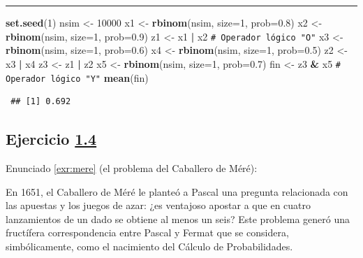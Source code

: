 \documentclass[
  spanish,
  10pt,
]{book}
\newenvironment{Shaded}{\begin{snugshade}}{\end{snugshade}}
\newcommand{\AttributeTok}[1]{\textcolor[rgb]{0.13,0.29,0.53}{#1}}
\newcommand{\CommentTok}[1]{\textcolor[rgb]{0.56,0.35,0.01}{\textit{#1}}}
\newcommand{\DecValTok}[1]{\textcolor[rgb]{0.00,0.00,0.81}{#1}}
\newcommand{\FloatTok}[1]{\textcolor[rgb]{0.00,0.00,0.81}{#1}}
\newcommand{\FunctionTok}[1]{\textcolor[rgb]{0.13,0.29,0.53}{\textbf{#1}}}
\newcommand{\NormalTok}[1]{#1}
\newcommand{\OtherTok}[1]{\textcolor[rgb]{0.56,0.35,0.01}{#1}}
\newcommand{\SpecialCharTok}[1]{\textcolor[rgb]{0.81,0.36,0.00}{\textbf{#1}}}
\theoremstyle{break}
\theoremstyle{nonumberplain}
\renewcommand{\CommentTok}[1]{\textcolor[rgb]{0.41,0.41,0.41}{\texttt{#1}}}
\begin{document}
\begin{center}\rule{0.5\linewidth}{0.5pt}\end{center}

\begin{Shaded}
\begin{Highlighting}[]
\FunctionTok{set.seed}\NormalTok{(}\DecValTok{1}\NormalTok{)}
\NormalTok{nsim }\OtherTok{\textless{}{-}} \DecValTok{10000}
\NormalTok{x1 }\OtherTok{\textless{}{-}} \FunctionTok{rbinom}\NormalTok{(nsim, }\AttributeTok{size=}\DecValTok{1}\NormalTok{, }\AttributeTok{prob=}\FloatTok{0.8}\NormalTok{)}
\NormalTok{x2 }\OtherTok{\textless{}{-}} \FunctionTok{rbinom}\NormalTok{(nsim, }\AttributeTok{size=}\DecValTok{1}\NormalTok{, }\AttributeTok{prob=}\FloatTok{0.9}\NormalTok{)}
\NormalTok{z1 }\OtherTok{\textless{}{-}}\NormalTok{ x1 }\SpecialCharTok{|}\NormalTok{ x2   }\CommentTok{\# Operador lógico "O"}
\NormalTok{x3 }\OtherTok{\textless{}{-}} \FunctionTok{rbinom}\NormalTok{(nsim, }\AttributeTok{size=}\DecValTok{1}\NormalTok{, }\AttributeTok{prob=}\FloatTok{0.6}\NormalTok{)}
\NormalTok{x4 }\OtherTok{\textless{}{-}} \FunctionTok{rbinom}\NormalTok{(nsim, }\AttributeTok{size=}\DecValTok{1}\NormalTok{, }\AttributeTok{prob=}\FloatTok{0.5}\NormalTok{)}
\NormalTok{z2 }\OtherTok{\textless{}{-}}\NormalTok{ x3 }\SpecialCharTok{|}\NormalTok{ x4}
\NormalTok{z3 }\OtherTok{\textless{}{-}}\NormalTok{ z1 }\SpecialCharTok{|}\NormalTok{ z2}
\NormalTok{x5 }\OtherTok{\textless{}{-}} \FunctionTok{rbinom}\NormalTok{(nsim, }\AttributeTok{size=}\DecValTok{1}\NormalTok{, }\AttributeTok{prob=}\FloatTok{0.7}\NormalTok{)}
\NormalTok{fin }\OtherTok{\textless{}{-}}\NormalTok{ z3 }\SpecialCharTok{\&}\NormalTok{ x5  }\CommentTok{\# Operador lógico "Y"}
\FunctionTok{mean}\NormalTok{(fin)}
\end{Highlighting}
\end{Shaded}

\begin{verbatim}
 ## [1] 0.692
\end{verbatim}

\subsection{\texorpdfstring{Ejercicio \href{ejercicios.html\#exr:mere}{1.4}}{Ejercicio 1.4}}\label{sol-mere}

Enunciado \ref{exr:mere} (el problema del Caballero de Méré):

En 1651, el Caballero de Méré le planteó a Pascal una pregunta
relacionada con las apuestas y los juegos de azar: ¿es ventajoso
apostar a que en cuatro lanzamientos de un dado se obtiene al menos
un seis? Este problema generó una fructífera correspondencia entre
Pascal y Fermat que se considera, simbólicamente, como el nacimiento
del Cálculo de Probabilidades.
\end{document}
